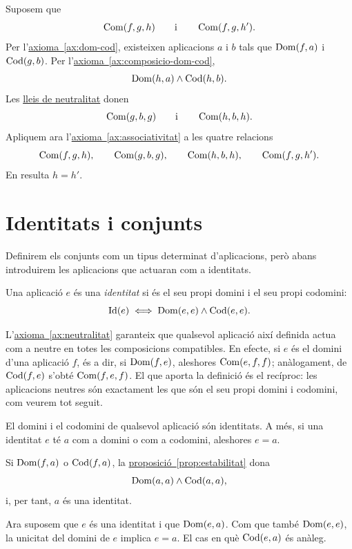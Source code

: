 \begin{prova}
Suposem que
\[
\operatorname{Com}(f,g,h)
\qquad\text{i}\qquad
\operatorname{Com}(f,g,h').
\]
Per l'\hyperref[ax:dom-cod]{axioma~\ref*{ax:dom-cod}}, existeixen aplicacions \(a\) i \(b\) tals que \(\operatorname{Dom}(f,a)\) i \(\operatorname{Cod}(g,b)\). Per l'\hyperref[ax:composicio-dom-cod]{axioma~\ref*{ax:composicio-dom-cod}},
\[
\operatorname{Dom}(h,a)\land\operatorname{Cod}(h,b).
\]
Les \hyperref[ax:neutralitat]{lleis de neutralitat} donen
\[
\operatorname{Com}(g,b,g)
\qquad\text{i}\qquad
\operatorname{Com}(h,b,h).
\]
Apliquem ara l'\hyperref[ax:associativitat]{axioma~\ref*{ax:associativitat}} a les quatre relacions
\[
\operatorname{Com}(f,g,h),\qquad
\operatorname{Com}(g,b,g),\qquad
\operatorname{Com}(h,b,h),\qquad
\operatorname{Com}(f,g,h').
\]
En resulta \(h=h'\).
\end{prova}

\section{Identitats i conjunts}\label{sec:identitats-conjunts}

Definirem els conjunts com un tipus determinat d'aplicacions, però abans introduirem les aplicacions que actuaran com a identitats.

\begin{definicio}\label{def:identitat}
Una aplicació \(e\) és una \emph{identitat} si és el seu propi domini i el seu propi codomini:
\[
\operatorname{Id}(e)
\iff
\operatorname{Dom}(e,e)\land \operatorname{Cod}(e,e).
\]
\end{definicio}

L'\hyperref[ax:neutralitat]{axioma~\ref*{ax:neutralitat}} garanteix que qualsevol aplicació així definida actua com a neutre en totes les composicions compatibles. En efecte, si \(e\) és el domini d'una aplicació \(f\), és a dir, si \(\operatorname{Dom}(f,e)\), aleshores \(\operatorname{Com}(e,f,f)\); anàlogament, de \(\operatorname{Cod}(f,e)\) s'obté \(\operatorname{Com}(f,e,f)\). El que aporta la definició és el recíproc: les aplicacions neutres són exactament les que són el seu propi domini i codomini, com veurem tot seguit.

\begin{proposicio}\label{prop:dom-cod-identitats}
El domini i el codomini de qualsevol aplicació són identitats. A més, si una identitat \(e\) té \(a\) com a domini o com a codomini, aleshores \(e=a\).
\end{proposicio}

\begin{prova}
Si \(\operatorname{Dom}(f,a)\) o \(\operatorname{Cod}(f,a)\), la \hyperref[prop:estabilitat]{proposició~\ref*{prop:estabilitat}} dona
\[
\operatorname{Dom}(a,a)\land \operatorname{Cod}(a,a),
\]
i, per tant, \(a\) és una identitat.

Ara suposem que \(e\) és una identitat i que \(\operatorname{Dom}(e,a)\). Com que també \(\operatorname{Dom}(e,e)\), la unicitat del domini de \(e\) implica \(e=a\). El cas en què \(\operatorname{Cod}(e,a)\) és anàleg.
\end{prova}

